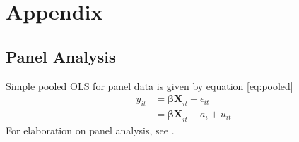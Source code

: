 \section{Appendix}
\label{s:appendix}

\subsection{Panel Analysis}
\label{s:appendix_panel}
Simple pooled OLS for panel data is given by equation \eqref{eq:pooled} \citep{wooldridge2019introductory}
\begin{align}\label{eq:pooled}
    y_{it}
    &= \bm{\beta X}_{it} + \epsilon_{it} \\ 
    &= \bm{\beta X}_{it} + a_i + u_{it} \nonumber
\end{align}
For elaboration on panel analysis, see \citet[chapter 14]{wooldridge2019introductory}.

\begin{figure}
    \centering
\end{figure}
